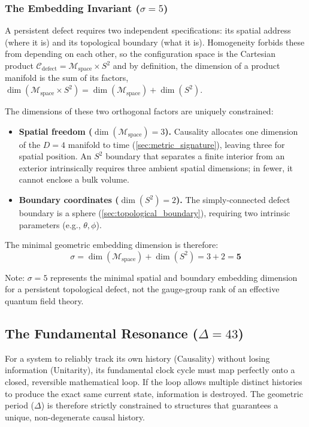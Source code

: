 \subsubsection{The Embedding Invariant (\texorpdfstring{$\sigma=5$}{sigma=5})}
\label{sec:embedding_invariant}

A persistent defect requires two independent specifications: its spatial address (where it is) and its topological boundary (what it is). Homogeneity forbids these from depending on each other, so the configuration space is the Cartesian product $\mathcal{C}_{\text{defect}} = \mathcal{M}_{\text{space}} \times S^2$ and by definition, the dimension of a product manifold is the sum of its factors, $\dim(\mathcal{M}_{\text{space}} \times S^2) = \dim(\mathcal{M}_{\text{space}}) + \dim(S^2)$.

The dimensions of these two orthogonal factors are uniquely constrained:
\begin{itemize}
    \item \textbf{Spatial freedom ($\dim(\mathcal{M}_{\text{space}}) = 3$).} Causality allocates one dimension of the $D=4$ manifold to time (\cref{sec:metric_signature}), leaving three for spatial position. An $S^2$ boundary that separates a finite interior from an exterior intrinsically requires three ambient spatial dimensions; in fewer, it cannot enclose a bulk volume.
    \item \textbf{Boundary coordinates ($\dim(S^2) = 2$).} The simply-connected defect boundary is a sphere (\cref{sec:topological_boundary}), requiring two intrinsic parameters (e.g., $\theta, \phi$).
\end{itemize}

The minimal geometric embedding dimension is therefore:
\begin{equation}
    \sigma = \dim(\mathcal{M}_{\text{space}}) + \dim(S^2) = 3 + 2 = \mathbf{5}
\end{equation}

Note: $\sigma=5$ represents the minimal spatial and boundary embedding dimension for a persistent topological defect, not the gauge-group rank of an effective quantum field theory.


\subsection{The Fundamental Resonance (\texorpdfstring{$\Delta=43$}{Delta=43})}
\label{sec:fundamental_resonance}

For a system to reliably track its own history (Causality) without losing information (Unitarity), its fundamental clock cycle must map perfectly onto a closed, reversible mathematical loop. If the loop allows multiple distinct histories to produce the exact same current state, information is destroyed. The geometric period ($\Delta$) is therefore strictly constrained to structures that guarantees a unique, non-degenerate causal history.

